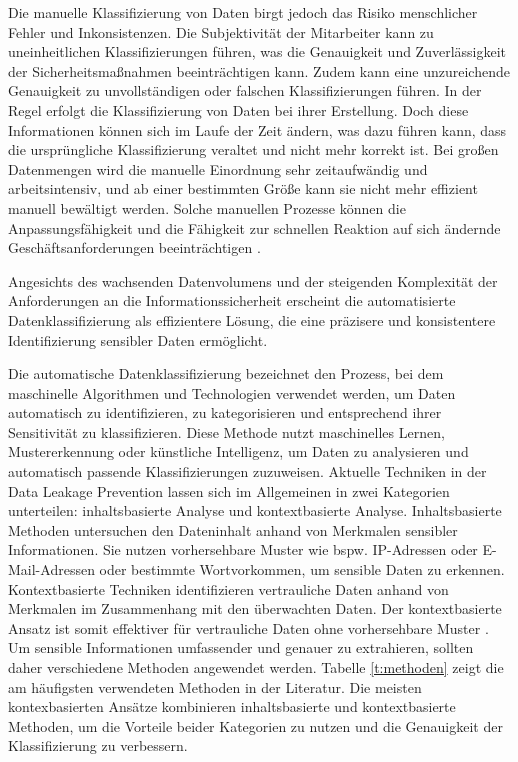 Die manuelle Klassifizierung von Daten birgt jedoch das Risiko menschlicher Fehler und Inkonsistenzen. Die Subjektivität der Mitarbeiter kann zu uneinheitlichen Klassifizierungen führen, was die Genauigkeit und Zuverlässigkeit der Sicherheitsmaßnahmen beeinträchtigen kann. Zudem kann eine unzureichende Genauigkeit zu unvollständigen oder falschen Klassifizierungen führen. In der Regel erfolgt die Klassifizierung von Daten bei ihrer Erstellung. Doch diese Informationen können sich im Laufe der Zeit ändern, was dazu führen kann, dass die ursprüngliche Klassifizierung veraltet und nicht mehr korrekt ist. Bei großen Datenmengen wird die manuelle Einordnung sehr zeitaufwändig und arbeitsintensiv, und ab einer bestimmten Größe kann sie nicht mehr effizient manuell bewältigt werden. Solche manuellen Prozesse können die Anpassungsfähigkeit und die Fähigkeit zur schnellen Reaktion auf sich ändernde Geschäftsanforderungen beeinträchtigen \cite{Venhorst.2019}.

Angesichts des wachsenden Datenvolumens und der steigenden Komplexität der Anforderungen an die Informationssicherheit erscheint die automatisierte Datenklassifizierung als effizientere Lösung, die eine präzisere und konsistentere Identifizierung sensibler Daten ermöglicht.

Die automatische Datenklassifizierung bezeichnet den Prozess, bei dem maschinelle Algorithmen und Technologien verwendet werden, um Daten automatisch zu identifizieren, zu kategorisieren und entsprechend ihrer Sensitivität zu klassifizieren. Diese Methode nutzt maschinelles Lernen, Mustererkennung oder künstliche Intelligenz, um Daten zu analysieren und automatisch passende Klassifizierungen zuzuweisen.
Aktuelle Techniken in der Data Leakage Prevention lassen sich im Allgemeinen in zwei Kategorien unterteilen: inhaltsbasierte Analyse und kontextbasierte Analyse. Inhaltsbasierte Methoden untersuchen den Dateninhalt anhand von Merkmalen sensibler Informationen. Sie nutzen vorhersehbare Muster wie bspw. IP-Adressen oder E-Mail-Adressen oder bestimmte Wortvorkommen, um sensible Daten zu erkennen. Kontextbasierte Techniken identifizieren vertrauliche Daten anhand von Merkmalen im Zusammenhang mit den überwachten Daten. Der kontextbasierte Ansatz ist somit effektiver für vertrauliche Daten ohne vorhersehbare Muster \cite{Guo.2021}\cite{Gugelmann.2015}\cite{Kuzina.2023}. Um sensible Informationen umfassender und genauer zu extrahieren, sollten daher verschiedene Methoden angewendet werden. Tabelle \ref{t:methoden} zeigt die am häufigsten verwendeten Methoden in der Literatur. Die meisten kontexbasierten Ansätze kombinieren inhaltsbasierte und kontextbasierte Methoden, um die Vorteile beider Kategorien zu nutzen und die Genauigkeit der Klassifizierung zu verbessern.

